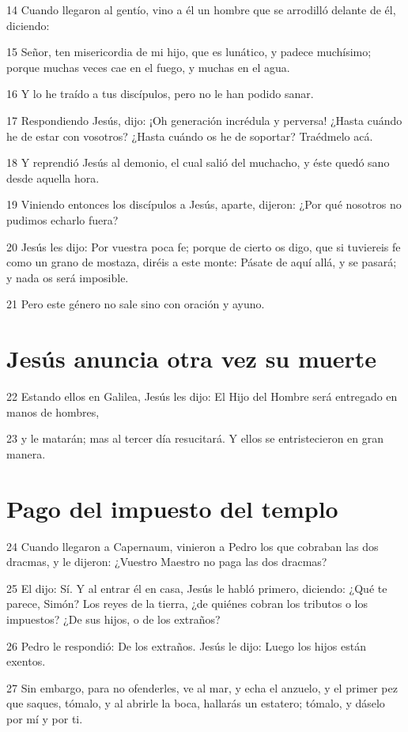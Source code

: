 \par 14 Cuando llegaron al gentío, vino a él un hombre que se arrodilló delante de él, diciendo:
\par 15 Señor, ten misericordia de mi hijo, que es lunático, y padece muchísimo; porque muchas veces cae en el fuego, y muchas en el agua.
\par 16 Y lo he traído a tus discípulos, pero no le han podido sanar.
\par 17 Respondiendo Jesús, dijo: ¡Oh generación incrédula y perversa! ¿Hasta cuándo he de estar con vosotros? ¿Hasta cuándo os he de soportar? Traédmelo acá.
\par 18 Y reprendió Jesús al demonio, el cual salió del muchacho, y éste quedó sano desde aquella hora.
\par 19 Viniendo entonces los discípulos a Jesús, aparte, dijeron: ¿Por qué nosotros no pudimos echarlo fuera?
\par 20 Jesús les dijo: Por vuestra poca fe; porque de cierto os digo, que si tuviereis fe como un grano de mostaza, diréis a este monte: Pásate de aquí allá, y se pasará; y nada os será imposible.
\par 21 Pero este género no sale sino con oración y ayuno.

\section*{Jesús anuncia otra vez su muerte}

\par 22 Estando ellos en Galilea, Jesús les dijo: El Hijo del Hombre será entregado en manos de hombres,
\par 23 y le matarán; mas al tercer día resucitará. Y ellos se entristecieron en gran manera.

\section*{Pago del impuesto del templo}

\par 24 Cuando llegaron a Capernaum, vinieron a Pedro los que cobraban las dos dracmas, y le dijeron: ¿Vuestro Maestro no paga las dos dracmas?
\par 25 El dijo: Sí. Y al entrar él en casa, Jesús le habló primero, diciendo: ¿Qué te parece, Simón? Los reyes de la tierra, ¿de quiénes cobran los tributos o los impuestos? ¿De sus hijos, o de los extraños?
\par 26 Pedro le respondió: De los extraños. Jesús le dijo: Luego los hijos están exentos.
\par 27 Sin embargo, para no ofenderles, ve al mar, y echa el anzuelo, y el primer pez que saques, tómalo, y al abrirle la boca, hallarás un estatero; tómalo, y dáselo por mí y por ti.


